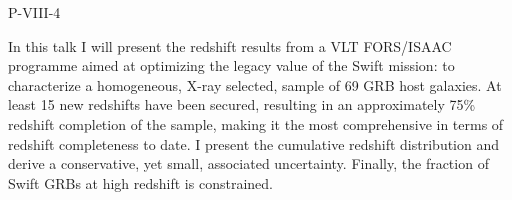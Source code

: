 P-VIII-4


\bigskip



\bigskip

\noindent In this talk I will present the redshift results from a VLT FORS/ISAAC programme aimed at optimizing the legacy value of the Swift mission: to characterize a homogeneous, X-ray selected, sample of 69 GRB host galaxies. At least 15 new redshifts have been secured, resulting in an approximately 75\% redshift completion of the sample, making it the most comprehensive in terms of redshift completeness to date. I present the cumulative redshift distribution and derive a conservative, yet small, associated uncertainty. Finally, the fraction of Swift GRBs at high redshift is constrained.


